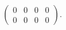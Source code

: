 \begin{Exercise}
	\begin{answer}
		$
		\begin{pmatrix}
		0 & 0 & 0 & 0 \\
		0 & 0 & 0 & 0
		\end{pmatrix}.
		$
	\end{answer}
\end{Exercise}